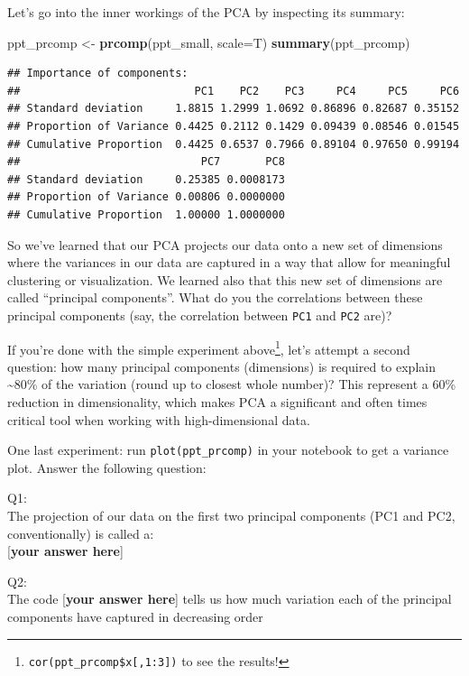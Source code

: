 \documentclass[]{article}
\newenvironment{Shaded}{\begin{snugshade}}{\end{snugshade}}
\newcommand{\DataTypeTok}[1]{\textcolor[rgb]{0.13,0.29,0.53}{#1}}
\newcommand{\KeywordTok}[1]{\textcolor[rgb]{0.13,0.29,0.53}{\textbf{#1}}}
\newcommand{\NormalTok}[1]{#1}
\newcommand{\StringTok}[1]{\textcolor[rgb]{0.31,0.60,0.02}{#1}}
\let\rmarkdownfootnote\footnote%
\def\footnote{\protect\rmarkdownfootnote}
\begin{document}
Let's go into the inner workings of the PCA by inspecting its summary:

\begin{Shaded}
\begin{Highlighting}[]
\NormalTok{ppt_prcomp <-}\StringTok{ }\KeywordTok{prcomp}\NormalTok{(ppt_small, }\DataTypeTok{scale=}\NormalTok{T)}
\KeywordTok{summary}\NormalTok{(ppt_prcomp)}
\end{Highlighting}
\end{Shaded}

\begin{verbatim}
## Importance of components:
##                           PC1    PC2    PC3     PC4     PC5     PC6
## Standard deviation     1.8815 1.2999 1.0692 0.86896 0.82687 0.35152
## Proportion of Variance 0.4425 0.2112 0.1429 0.09439 0.08546 0.01545
## Cumulative Proportion  0.4425 0.6537 0.7966 0.89104 0.97650 0.99194
##                            PC7       PC8
## Standard deviation     0.25385 0.0008173
## Proportion of Variance 0.00806 0.0000000
## Cumulative Proportion  1.00000 1.0000000
\end{verbatim}

So we've learned that our PCA projects our data onto a new set of
dimensions where the variances in our data are captured in a way that
allow for meaningful clustering or visualization. We learned also that
this new set of dimensions are called ``principal components''. What do
you the correlations between these principal components (say, the
correlation between \texttt{PC1} and \texttt{PC2} are)?

If you're done with the simple experiment above\footnote{\texttt{cor(ppt\_prcomp\$x{[},1:3{]})}
  to see the results!}, let's attempt a second question: how many
principal components (dimensions) is required to explain
\textasciitilde{}80\% of the variation (round up to closest whole
number)? This represent a 60\% reduction in dimensionality, which makes
PCA a significant and often times critical tool when working with
high-dimensional data.

One last experiment: run \texttt{plot(ppt\_prcomp)} in your notebook to
get a variance plot. Answer the following question:

Q1:\\
The projection of our data on the first two principal components (PC1
and PC2, conventionally) is called a:\\
{[}\textbf{your answer here}{]}

Q2:\\
The code {[}\textbf{your answer here}{]} tells us how much variation
each of the principal components have captured in decreasing order
\end{document}
